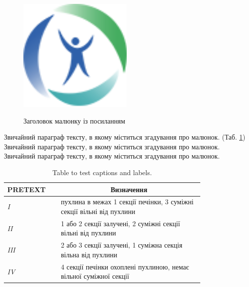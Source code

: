\begin{figure}[h]
\caption{Заголовок малюнку із посиланням \cite{Chen2019}}
\centering
\includegraphics[width=0.5\textwidth]{Illustrations/Logo.png}
\label{fig:NameOfPicture} %
\end{figure}

Звичайний параграф тексту, в якому міститься згадування про малюнок. (Таб. \ref{table:NameOfTable}) %
Звичайний параграф тексту, в якому міститься згадування про малюнок. Звичайний параграф тексту, в якому міститься згадування про малюнок. 



\begin{table}[]

\begin{tabular}{|p{0.2\linewidth}|
                 p{0.6\linewidth}|}
\hline
\textbf{PRETEXT} & \multicolumn{1}{c|}{\textbf{Визначення}}                              \\ \hline
\textit{I}       & пухлина в межах 1 секції печінки, 3 суміжні секції вільні від пухлини \\ \hline
\textit{II}      & 1 або 2 секції залучені, 2 суміжні секції вільні від пухлини          \\ \hline
\textit{III}     & 2 або 3 секції залучені, 1 суміжна секція вільна від пухлини          \\ \hline
\textit{IV}      & 4 секції печінки охоплені пухлиною, немає вільної суміжної секції     \\ \hline
\end{tabular}
\caption{Table to test captions and labels.\cite{Chen2019}}
\label{table:NameOfTable}
\end{table}



